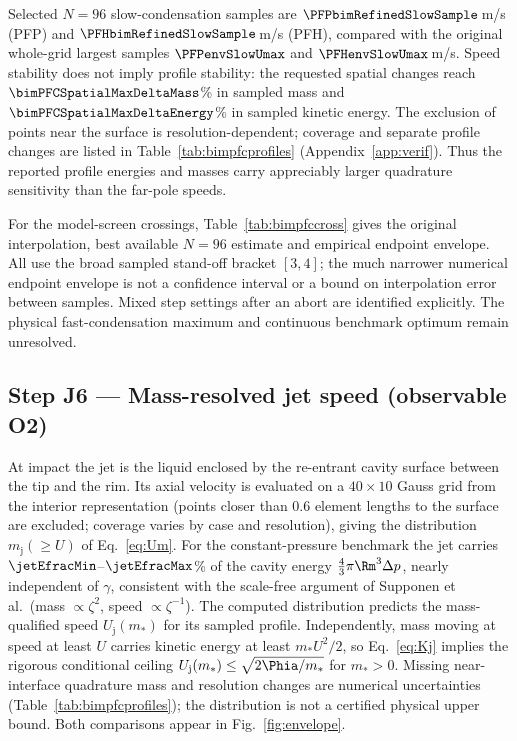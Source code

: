 Selected $N=96$ slow-condensation samples are $\PFPbimRefinedSlowSample$\,m/s (PFP) and
$\PFHbimRefinedSlowSample$\,m/s (PFH), compared with the original whole-grid largest samples
$\PFPenvSlowUmax$ and $\PFHenvSlowUmax$\,m/s. Speed stability does not imply profile stability:
the requested spatial changes reach $\bimPFCSpatialMaxDeltaMass$\% in sampled mass and
$\bimPFCSpatialMaxDeltaEnergy$\% in sampled kinetic energy. The exclusion of points near the
surface is resolution-dependent; coverage and separate profile changes are listed in
Table~\ref{tab:bimpfcprofiles} (Appendix~\ref{app:verif}). Thus the reported profile energies
and masses carry appreciably larger quadrature sensitivity than the far-pole speeds.

For the model-screen crossings, Table~\ref{tab:bimpfccross} gives the original interpolation,
best available $N=96$ estimate and empirical endpoint envelope. All use the broad sampled
stand-off bracket $[3,4]$; the much narrower numerical endpoint envelope is not a confidence
interval or a bound on interpolation error between samples. Mixed step settings after an
abort are identified explicitly. The physical fast-condensation maximum and continuous
benchmark optimum remain unresolved.


\subsection{Step J6 --- Mass-resolved jet speed (observable O2)}
At impact the jet is the liquid enclosed by the re-entrant cavity surface between the tip and the rim. Its
axial velocity is evaluated on a $40\times10$ Gauss grid from the interior representation (points closer
than 0.6 element lengths to the surface are excluded; coverage varies by case and resolution), giving the
distribution $m_{\mathrm j}(\ge U)$ of Eq.~\eqref{eq:Um}. For the constant-pressure benchmark the jet
carries $\jetEfracMin$--$\jetEfracMax$\% of the cavity energy $\tfrac43\pi\Rm^3\Delta p$, nearly independent of
$\gamma$, consistent with the scale-free argument of Supponen et al.\ (mass $\propto\zeta^2$, speed
$\propto\zeta^{-1}$). The computed distribution predicts the mass-qualified speed
$U_{\mathrm j}(m_*)$ for its sampled profile. Independently, mass moving at speed at least $U$ carries
kinetic energy at least $m_*U^2/2$, so Eq.~\eqref{eq:Kj} implies the rigorous conditional
ceiling $U_{\mathrm j}(m_*)\le\sqrt{2\Phia/m_*}$ for $m_*>0$. Missing near-interface quadrature
mass and resolution changes are numerical uncertainties (Table~\ref{tab:bimpfcprofiles}); the distribution is not a certified
physical upper bound. Both comparisons appear in Fig.~\ref{fig:envelope}.

